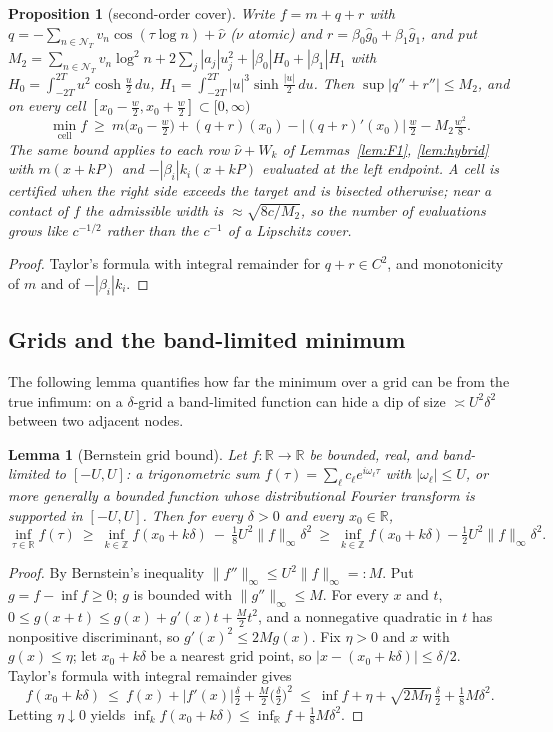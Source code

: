 \documentclass[11pt]{amsart}
\newtheorem{proposition}[theorem]{Proposition}
\newtheorem{lemma}[theorem]{Lemma}
\theoremstyle{definition}
\theoremstyle{remark}
\newcommand{\R}{\mathbb R}
\newcommand{\Z}{\mathbb Z}
\newcommand{\gh}[1]{\widehat g_{#1}}
\newcommand{\nuh}{\widehat\nu}
\newcommand{\NT}{\mathcal N_T}
\begin{document}
\begin{proposition}[second-order cover]\label{prop:TAY}
Write $f=m+q+r$ with $q=-\sum_{n\in\NT}v_n\cos(\tau\log n)+\nuh$ ($\nu$ atomic) and
$r=\beta_0\gh0+\beta_1\gh1$, and put
$M_2=\sum_{n\in\NT}v_n\log^2n+2\sum_j|a_j|u_j^2+|\beta_0|H_0+|\beta_1|H_1$ with
$H_0=\int_{-2T}^{2T}u^2\cosh\frac u2\,du$, $H_1=\int_{-2T}^{2T}|u|^3\sinh\frac{|u|}2\,du$. Then
$\sup|q''+r''|\le M_2$, and on every cell $[x_0-\frac w2,x_0+\frac w2]\subset[0,\infty)$
\[
\min_{\text{cell}}f\ \ge\ m\!\big(x_0-\tfrac w2\big)+(q+r)(x_0)-|(q+r)'(x_0)|\,\tfrac w2-M_2\tfrac{w^2}8 .
\]
The same bound applies to each row $\nuh+W_k$ of Lemmas~\ref{lem:F1}, \ref{lem:hybrid} with
$m(x+kP)$ and $-|\beta_i|k_i(x+kP)$ evaluated at the left endpoint. A cell is certified when the
right side exceeds the target and is bisected otherwise; near a contact of $f$ the admissible width
is $\approx\sqrt{8c/M_2}$, so the number of evaluations grows like $c^{-1/2}$ rather than the
$c^{-1}$ of a Lipschitz cover.
\end{proposition}
\begin{proof}
Taylor's formula with integral remainder for $q+r\in C^2$, and monotonicity of $m$ and of
$-|\beta_i|k_i$.
\end{proof}

\subsection{Grids and the band-limited minimum}
The following lemma quantifies how far the minimum over a grid can be from the true infimum: on a
$\delta$-grid a band-limited function can hide a dip of size $\asymp U^2\delta^2$ between two adjacent
nodes.

\begin{lemma}[Bernstein grid bound]\label{lem:bern}
Let $f:\R\to\R$ be bounded, real, and band-limited to $[-U,U]$: a trigonometric sum
$f(\tau)=\sum_{\ell}c_\ell e^{i\omega_\ell\tau}$ with $|\omega_\ell|\le U$, or more generally a
bounded function whose distributional Fourier transform is supported in $[-U,U]$. Then for every
$\delta>0$ and every $x_0\in\R$,
\[
\inf_{\tau\in\R}f(\tau)\ \ge\ \inf_{k\in\Z}f(x_0+k\delta)\ -\ \tfrac18U^2\|f\|_\infty\delta^2
\ \ge\ \inf_{k\in\Z}f(x_0+k\delta)-\tfrac12U^2\|f\|_\infty\delta^2 .
\]
\end{lemma}
\begin{proof}
By Bernstein's inequality $\|f''\|_\infty\le U^2\|f\|_\infty=:M$. Put $g=f-\inf f\ge0$; $g$ is
bounded with $\|g''\|_\infty\le M$. For every $x$ and $t$, $0\le g(x+t)\le g(x)+g'(x)t+\frac M2t^2$,
and a nonnegative quadratic in $t$ has nonpositive discriminant, so $g'(x)^2\le2Mg(x)$. Fix
$\eta>0$ and $x$ with $g(x)\le\eta$; let $x_0+k\delta$ be a nearest grid point, so
$|x-(x_0+k\delta)|\le\delta/2$. Taylor's formula with integral remainder gives
\[
f(x_0+k\delta)\ \le\ f(x)+|f'(x)|\tfrac\delta2+\tfrac M2\Big(\tfrac\delta2\Big)^2
\ \le\ \inf f+\eta+\sqrt{2M\eta}\,\tfrac\delta2+\tfrac18M\delta^2 .
\]
Letting $\eta\downarrow0$ yields $\inf_kf(x_0+k\delta)\le\inf_\R f+\frac18M\delta^2$.
\end{proof}
\end{document}
